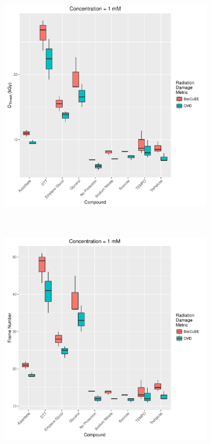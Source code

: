 \begin{figure}
    \centering
    \begin{subfigure}[b]{0.75\textwidth}
            \centering
            \includegraphics[width=\textwidth]{figures/saxs/Conc_1_dose.pdf}
            \caption{}
            \label{fig:SAXS dose- 1mM}
    \end{subfigure}
    \\
    \begin{subfigure}[b]{0.75\textwidth}
            \centering
            \includegraphics[width=\textwidth]{figures/saxs/Conc_1_frame_num.pdf}
            \caption{}
            \label{fig:SAXS frame- 1mM}
    \end{subfigure}
\end{figure}
